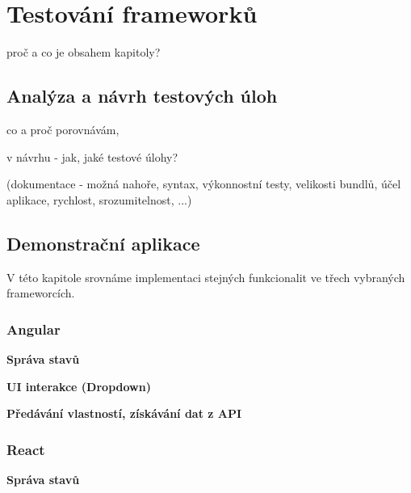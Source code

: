 \section{Testování frameworků}

\begin{citemize}
	\item proč a co je obsahem kapitoly?
\end{citemize}

\subsection{Analýza a návrh testových úloh}

\begin{citemize}
	\item co a proč porovnávám,
	\item v návrhu - jak, jaké testové úlohy?
	\item (dokumentace - možná nahoře, syntax, výkonnostní testy, velikosti bundlů, účel aplikace, rychlost, srozumitelnost, ...)
\end{citemize}

\subsection{Demonstrační aplikace}

V této kapitole srovnáme implementaci stejných funkcionalit ve třech vybraných frameworcích.

\subsubsection{Angular}

\begin{flushleft}
  \textbf{Správa stavů}
\end{flushleft}

\begin{flushleft}
  \textbf{UI interakce (Dropdown)}
\end{flushleft}

\begin{flushleft}
  \textbf{Předávání vlastností, získávání dat z API}
\end{flushleft}

\subsubsection{React}

\begin{flushleft}
  \textbf{Správa stavů}
\end{flushleft}

